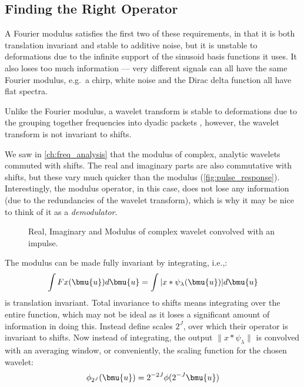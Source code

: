 \subsection{Finding the Right Operator}
  A Fourier modulus satisfies the first two of these requirements, in that it is
  both translation invariant and stable to additive noise, but it is unstable to
  deformations due to the infinite support of the sinusoid basis functions it
  uses. It also loses too much information --- very different signals can all
  have the same Fourier modulus, e.g.\ a chirp, white noise and the Dirac delta
  function all have flat spectra.

  Unlike the Fourier modulus, a wavelet transform
  is stable to deformations due to the grouping together frequencies into dyadic
  packets \citep{mallat_group_2012}, however, the wavelet transform is not invariant to
  shifts. 
  
  We saw in \autoref{ch:freq_analysis} that the modulus of complex, analytic
  wavelets commuted with shifts. The real and imaginary parts are also
  commutative with shifts, but these vary much quicker than the modulus
  (\autoref{fig:pulse_response}).  Interestingly, the modulus operator, in this
  case, does not lose any information \citep{waldspurger_phase_2012} (due to the
  redundancies of the wavelet transform), which is why it may be nice to think
  of it as a \emph{demodulator}.

  \begin{figure}
    \begin{center}
      \newlength\figureheight 
      \newlength\figurewidth 
      \setlength\figureheight{6cm} 
      \setlength\figurewidth{8cm}
       
      \caption{Real, Imaginary and Modulus of complex wavelet convolved with
               an impulse.}
      \label{fig:pulse_response}
    \end{center}
  \end{figure}
  


  The modulus can be made fully invariant by integrating, i.e.,:
  $$\int F x(\bmu{u})d\bmu{u}= \int | x \ast \psi_{\lambda}(\bmu{u})| d\bmu{u}$$
  is translation invariant. 
  Total invariance to shifts means integrating over the entire function, which
  may not be ideal as it loses a significant amount of information in doing this. Instead
  \citeauthor{bruna_invariant_2013} define scales $2^J$, over which their operator
  is invariant to shifts. Now instead of integrating, the output $\|x \ast \psi_{\lambda}\|$ is
  convolved with an averaging window, or conveniently, the scaling function for
  the chosen wavelet:
  $$\phi_{2^J}(\bmu{u}) = 2^{-2J}\phi(2^{-J}\bmu{u})$$

